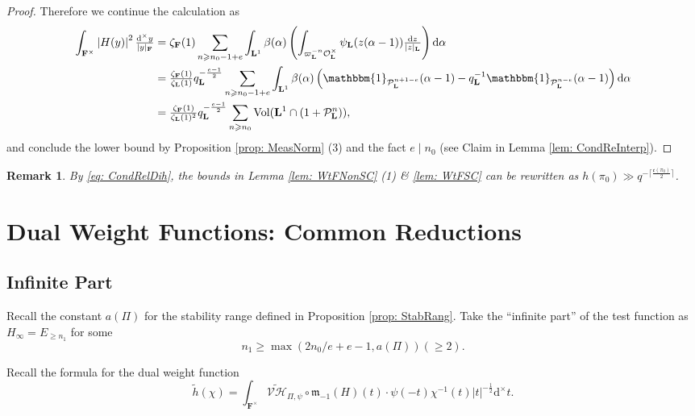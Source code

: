 \documentclass[A4]{amsart}
\def\geq{\geqslant}
\newtheorem{remark} [theorem] {Remark}
\numberwithin{equation}{section} \everymath{\displaystyle}
\newcommand{\id}{\mathbbm{1}}
\newcommand{\ud}{\mathrm{d}}
\newcommand{\F}{\mathbf{F}}
\newcommand{\bL}{\mathbf{L}}
\newcommand{\vO}{\mathcal{O}}
\newcommand{\vP}{\mathcal{P}}
\newcommand{\norm}[1][\cdot]{\lvert #1 \rvert}
\newcommand{\extnorm}[1]{\left\lvert #1 \right\rvert}
\newcommand{\Mult}{\mathfrak{m}}
\newcommand{\VorH}{\mathcal{VH}}
\newcommand{\cond}{\mathfrak{c}}
\newcommand{\Vol}{{\rm Vol}}
\begin{document}
\begin{proof}
	Therefore we continue the calculation as
\begin{align*}
	\int_{\F^{\times}} \extnorm{H(y)}^2 \tfrac{\ud^{\times} y}{\norm[y]_{\F}} &= \zeta_{\F}(1) \sum_{n \geq n_0-1+e} \int_{\bL^1} \beta(\alpha) \left( \int_{\varpi_{\bL}^{-n}\vO_{\bL}^{\times}} \psi_{\bL}(z(\alpha-1)) \tfrac{\ud z}{\norm[z]_{\bL}} \right) \ud \alpha \\
	&= \tfrac{\zeta_{\F}(1)}{\zeta_{\bL}(1)} q_{\bL}^{-\frac{e-1}{2}} \sum_{n \geq n_0-1+e} \int_{\bL^1} \beta(\alpha) \left( \id_{\vP_{\bL}^{n+1-e}}(\alpha-1) - q_{\bL}^{-1} \id_{\vP_{\bL}^{n-e}}(\alpha-1) \right) \ud \alpha \\
	&= \tfrac{\zeta_{\F}(1)}{\zeta_{\bL}(1)^2} q_{\bL}^{-\frac{e-1}{2}} \sum_{n \geq n_0} \Vol(\bL^1 \cap (1+\vP_{\bL}^n)),
\end{align*}
	and conclude the lower bound by Proposition \ref{prop: MeasNorm} (3) and the fact $e \mid n_0$ (see Claim in Lemma \ref{lem: CondReInterp}).
\end{proof}
\begin{remark}
	By \eqref{eq: CondRelDih}, the bounds in Lemma \ref{lem: WtFNonSC} (1) \& \ref{lem: WtFSC} can be rewritten as $h(\pi_0) \gg q^{-\lceil \frac{\cond(\pi_0)}{2} \rceil}$.
\end{remark}
	
	
	
\section{Dual Weight Functions: Common Reductions}


	\subsection{Infinite Part}
	
	Recall the constant $a(\Pi)$ for the stability range defined in Proposition \ref{prop: StabRang}. Take the ``infinite part'' of the test function as $H_{\infty} = E_{\geq n_1}$ for some
\begin{equation} \label{eq: StabPar}
	n_1 \geq \max(2n_0/e+e-1, a(\Pi)) (\geq 2).
\end{equation}

\noindent Recall the formula for the dual weight function
\begin{equation} \label{eq: DWtFviaBOI}
	\widetilde{h}(\chi) = \int_{\F^{\times}} \widetilde{\VorH}_{\Pi,\psi} \circ \Mult_{-1}(H)(t) \cdot \psi(-t) \chi^{-1}(t) \norm[t]^{-\frac{1}{2}} \ud^{\times} t.
\end{equation}
\end{document}
